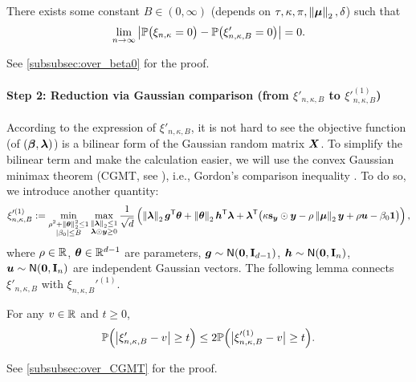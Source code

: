 \begin{lem} 
\label{lem:over_beta0}    
There exists some constant $B \in (0, \infty)$ (depends on $\tau, \kappa, \pi, \norm{\bmu}_2, \delta$) such that
    \begin{equation*}
        \lim_{n \to \infty} \abs{ \P\bigl( \xi_{n, \kappa} = 0 \bigr) - \P\bigl(\xi'_{n, \kappa, B} = 0 \bigr) } = 0.
    \end{equation*}
\end{lem}
\noindent
See \cref{subsubsec:over_beta0} for the proof.

\paragraph{Step 2: Reduction via Gaussian comparison (from $\xi'_{n, \kappa, B}$ to $\xi'^{(1)}_{n, \kappa, B}$)} 
According to the expression of $\xi'_{n, \kappa, B}$, it is not hard to see the objective function (of $(\vbeta, \blambda)$) is a bilinear form of the Gaussian random matrix $\XX$. To simplify the bilinear term and make the calculation easier, we will use the convex Gaussian minimax theorem (CGMT, see ), i.e., Gordon's comparison inequality \cite{gordon1985some, thrampoulidis2015regularized}. To do so, we introduce another quantity:
\begin{equation}\label{eq:xi1_n_kappa_B}
    \xi_{n, \kappa, B}'^{(1)} := \min_{ \substack{ \rho^2 + \norm{\vtheta}_2^2 \le 1 \\ \abs{\beta_0} \le B } } \max_{ \substack{ \norm{\blambda}_2 \le 1 \\ \blambda \odot \yy \ge 0} } \frac{1}{\sqrt{d}}  \left(
    \norm{\blambda}_2 \vg^\top \btheta + \norm{\btheta}_2 \vh^\top \blambda + \blambda^\top \bigl( 
        \kappa \bs_\yy \odot \yy - \rho\norm{\bmu}_2 \yy + \rho \vu - \beta_0 \bone
     \bigr)
     \right),
\end{equation}
where $\rho \in \R$, $\vtheta \in \R^{d-1}$ are parameters, $\vg \sim \normal(\bzero, \bI_{d-1})$, $\hh \sim \normal(\bzero, \bI_{n})$, $\uu \sim \normal(\bzero, \bI_{n})$ are independent Gaussian vectors. The following lemma connects $\xi'_{n, \kappa, B}$ with $\xi_{n, \kappa, B}'^{(1)}$.

\begin{lem} 
    \label{lem:over_CGMT}    
For any $v \in \R$ and $t \ge 0$,
    \begin{equation*}
        \P\Big( \big|\xi'_{n, \kappa, B} - v  \big| \ge t \Big) 
        \le 
        2 \P\Big( \big| \xi'^{(1)}_{n, \kappa, B} - v \big| \ge t \Big).
    \end{equation*}
\end{lem}
\noindent
See \cref{subsubsec:over_CGMT} for the proof.


